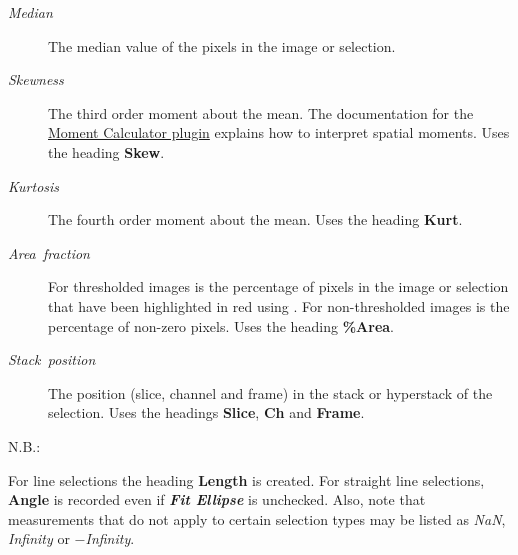 \begin{description}
\item [{\emph{Median}}] The median value of the pixels in the image or
selection.
\item [{\emph{Skewness}}] The third order moment about the mean. The documentation
for the \href{http://imagej.nih.gov/ij/plugins/moments.html}{Moment Calculator plugin}
explains how to interpret spatial moments. Uses the heading \textbf{Skew}.
\item [{\emph{Kurtosis}}] The fourth order moment about the mean. Uses
the heading \textbf{Kurt}.
\item [{\emph{Area\ fraction}}] \improvement{}For thresholded images
is the percentage of pixels in the image or selection that have been
highlighted in red using .
For non-thresholded images is the percentage of non-zero pixels. Uses
the heading \textbf{\%Area}.
\item [{\emph{Stack\ position}}] The position (slice, channel and frame)
in the stack or hyperstack of the selection. Uses the headings \textbf{Slice},
\textbf{Ch} and \textbf{Frame}.\end{description}
\begin{lyxlist}{N.B.:}
\item [{\textsc{n.b.:}}] \noindent For line selections the heading\textbf{
Length} is created. For straight line selections, \textbf{Angle} is
recorded even if \textbf{\emph{Fit Ellipse}} is unchecked. Also, note
that measurements that do not apply to certain selection types may
be listed as \emph{NaN}, \emph{Infinity} or \emph{$-$Infinity}.
\end{lyxlist}
\smallskip{}


